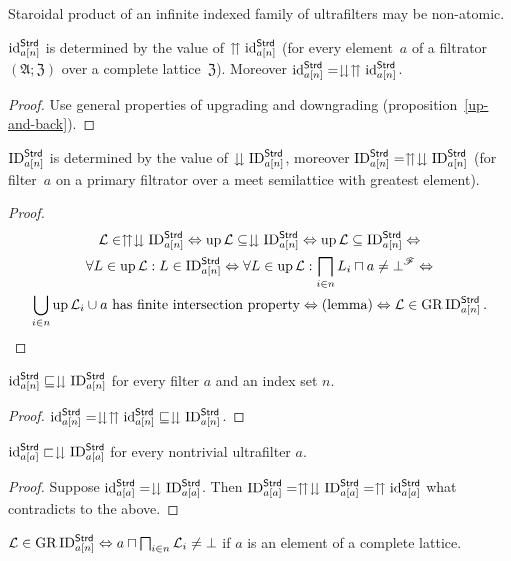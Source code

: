 \begin{cor}
Staroidal product of an infinite indexed family of ultrafilters may
be non-atomic.\end{cor}
\begin{prop}
$\operatorname{id}_{a[n]}^{\mathsf{Strd}}$ is determined by the value of $\upuparrows\operatorname{id}_{a[n]}^{\mathsf{Strd}}$
(for every element~$a$ of a filtrator $(\mathfrak{A};\mathfrak{Z})$ over a complete lattice~$\mathfrak{Z}$).
Moreover $\operatorname{id}_{a[n]}^{\mathsf{Strd}}=\downdownarrows\upuparrows\operatorname{id}_{a[n]}^{\mathsf{Strd}}$.\end{prop}
\begin{proof}
Use general properties of upgrading and downgrading (proposition~\ref{up-and-back}).\end{proof}
\begin{prop}
$\operatorname{ID}_{a[n]}^{\mathsf{Strd}}$ is determined by the value of $\downdownarrows\operatorname{ID}_{a[n]}^{\mathsf{Strd}}$,
moreover $\operatorname{ID}_{a[n]}^{\mathsf{Strd}}=\upuparrows\downdownarrows\operatorname{ID}_{a[n]}^{\mathsf{Strd}}$
(for filter~$a$ on a primary filtrator over a meet semilattice with greatest element).\end{prop}
\begin{proof}
~
\begin{multline*}
\mathcal{L}\in\upuparrows\downdownarrows\operatorname{ID}_{a[n]}^{\mathsf{Strd}}\Leftrightarrow\operatorname{up}\mathcal{L}\subseteq\downdownarrows\operatorname{ID}_{a[n]}^{\mathsf{Strd}}\Leftrightarrow\operatorname{up}\mathcal{L}\subseteq\operatorname{ID}_{a[n]}^{\mathsf{Strd}}\Leftrightarrow\\
\forall L\in\operatorname{up}\mathcal{L}:L\in\operatorname{ID}_{a[n]}^{\mathsf{Strd}}\Leftrightarrow\forall L\in\operatorname{up}\mathcal{L}:\bigsqcap_{i\in n}L_{i}\sqcap a\neq\bot^{\mathscr{F}}\Leftrightarrow\\
\bigcup_{i\in n}\operatorname{up}\mathcal{L}_{i}\cup a\text{ has finite intersection property}\Leftrightarrow\text{(lemma)}\Leftrightarrow\mathcal{L}\in\operatorname{GR}\operatorname{ID}_{a[n]}^{\mathsf{Strd}}.
\end{multline*}
\end{proof}
\begin{prop}
$\operatorname{id}_{a[n]}^{\mathsf{Strd}}\sqsubseteq\downdownarrows\operatorname{ID}_{a[n]}^{\mathsf{Strd}}$
for every filter $a$ and an index set $n$.\end{prop}
\begin{proof}
$\operatorname{id}_{a[n]}^{\mathsf{Strd}}=\downdownarrows\upuparrows\operatorname{id}_{a[n]}^{\mathsf{Strd}}\sqsubseteq\downdownarrows\operatorname{ID}_{a[n]}^{\mathsf{Strd}}$.\end{proof}
\begin{prop}
$\operatorname{id}_{a[a]}^{\mathsf{Strd}}\sqsubset\downdownarrows\operatorname{ID}_{a[a]}^{\mathsf{Strd}}$
for every nontrivial ultrafilter $a$.\end{prop}
\begin{proof}
Suppose $\operatorname{id}_{a[a]}^{\mathsf{Strd}}=\downdownarrows\operatorname{ID}_{a[a]}^{\mathsf{Strd}}$.
Then $\operatorname{ID}_{a[a]}^{\mathsf{Strd}}=\upuparrows\downdownarrows\operatorname{ID}_{a[a]}^{\mathsf{Strd}}=\upuparrows\operatorname{id}_{a[a]}^{\mathsf{Strd}}$
what contradicts to the above.\end{proof}
\begin{obvious}
$\mathcal{L}\in\operatorname{GR}\operatorname{ID}_{a[n]}^{\mathsf{Strd}}\Leftrightarrow a\sqcap\bigsqcap_{i\in n}\mathcal{L}_{i}\neq\bot$
if $a$ is an element of a complete lattice.
\end{obvious}

